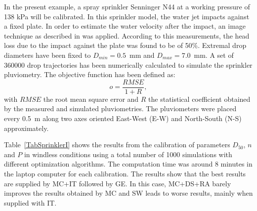 \documentclass[review,authoryear]{elsarticle}
\newcommand{\EQ}[2]
{\begin{equation}#1\label{#2}\end{equation}}
\begin{document}
In the present example, a spray sprinkler Senninger N44 at a working pressure of 138 kPa will be calibrated. In this sprinkler model, the water jet impacts against a fixed plate. In order to estimate the water velocity after the impact, an image technique as described in \citet{Salvador09} was applied. According to this measurements, the head loss due to the impact against the plate was found to be of 50\%. Extremal drop diameters have been fixed to $D_{min}=0.5$~mm and
$D_{max}=7.0$~mm. A set of 360000 drop trajectories has been numerically calculated to simulate the sprinkler pluviometry. The objective function has been defined as:
\EQ{o=\frac{RMSE}{1+R},}{EqSprinklerObjective}
with $RMSE$ the root mean square error and $R$ the statistical coefficient obtained by the
measured and simulated pluviometries. The pluviometers were placed every 0.5~m along two axes
oriented East-West (E-W) and North-South (N-S) approximately.

Table~\ref{TabSprinklerI} shows the results from the calibration of parameters $D_{50}$, $n$ and $P$ in windless conditions using a total number of 1000 simulations with different optimization algorithms. The computation time was around 8 minutes in the laptop computer for each calibration. The results show that the best results are supplied by MC+IT followed by GE. In this case,
MC+DS+RA barely improves the results obtained by MC 
and SW leads to worse results, mainly when supplied with IT. 
\end{document}
